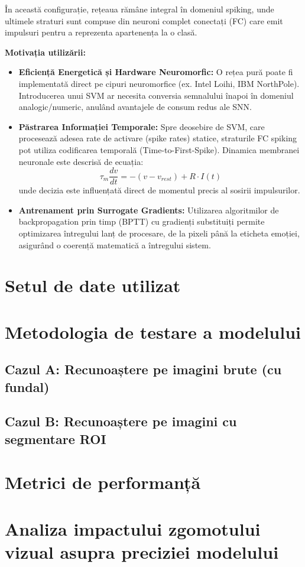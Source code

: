În această configurație, rețeaua rămâne integral în domeniul spiking, unde ultimele straturi sunt compuse din neuroni complet conectați (FC) care emit impulsuri pentru a reprezenta apartenența la o clasă.

\textbf{Motivația utilizării:}
\begin{itemize}
    \item \textbf{Eficiență Energetică și Hardware Neuromorfic:} O rețea pură poate fi implementată direct pe cipuri neuromorfice (ex. Intel Loihi, IBM NorthPole). Introducerea unui SVM ar necesita conversia semnalului înapoi în domeniul analogic/numeric, anulând avantajele de consum redus ale SNN.
    \item \textbf{Păstrarea Informației Temporale:} Spre deosebire de SVM, care procesează adesea rate de activare (spike rates) statice, straturile FC spiking pot utiliza codificarea temporală (Time-to-First-Spike). Dinamica membranei neuronale este descrisă de ecuația:
    \[ \tau_m \frac{dv}{dt} = -(v - v_{rest}) + R \cdot I(t) \]
    unde decizia este influențată direct de momentul precis al sosirii impulsurilor.
    \item \textbf{Antrenament prin Surrogate Gradients:} Utilizarea algoritmilor de backpropagation prin timp (BPTT) cu gradienți substituiți permite optimizarea întregului lanț de procesare, de la pixeli până la eticheta emoției, asigurând o coerență matematică a întregului sistem.
\end{itemize}

\section{Setul de date utilizat}
\section{Metodologia de testare a modelului}
\subsection{Cazul A: Recunoaștere pe imagini brute (cu fundal)}
\subsection{Cazul B: Recunoaștere pe imagini cu segmentare ROI}
\section{Metrici de performanță}
\section{Analiza impactului zgomotului vizual asupra preciziei modelului}
